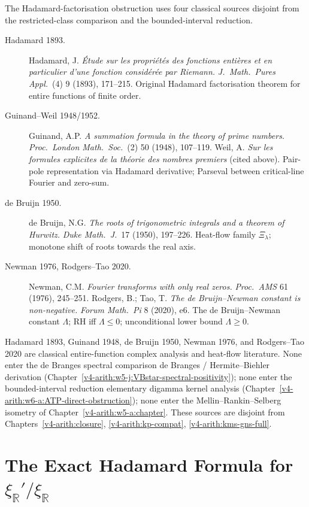 The Hadamard-factorisation obstruction uses four classical sources
disjoint from the restricted-class comparison and the bounded-interval reduction.

\begin{description}
\item[Hadamard 1893.] Hadamard, J. \emph{\'Etude sur les propri\'et\'es
des fonctions enti\`eres et en particulier d'une fonction consid\'er\'ee
par Riemann.} \emph{J.~Math.~Pures Appl.}~(4) 9 (1893), 171--215.
Original Hadamard factorisation theorem for entire functions of
finite order.
\item[Guinand--Weil 1948/1952.] Guinand, A.P. \emph{A summation formula
in the theory of prime numbers.} \emph{Proc.~London Math.~Soc.}~(2) 50
(1948), 107--119. Weil, A. \emph{Sur les formules explicites de la
th\'eorie des nombres premiers} (cited above). Pair-pole
representation via Hadamard derivative; Parseval between critical-line
Fourier and zero-sum.
\item[de Bruijn 1950.] de Bruijn, N.G. \emph{The roots of trigonometric
integrals and a theorem of Hurwitz.} \emph{Duke Math.~J.}~17 (1950),
197--226. Heat-flow family \(\Xi_{\lambda}\); monotone shift of roots
towards the real axis.
\item[Newman 1976, Rodgers--Tao 2020.] Newman, C.M. \emph{Fourier
transforms with only real zeros.} \emph{Proc.~AMS} 61 (1976), 245--251.
Rodgers, B.; Tao, T. \emph{The de Bruijn--Newman constant is
non-negative.} \emph{Forum Math.~Pi} 8 (2020), e6. The de Bruijn--Newman
constant \(\Lambda\); RH iff \(\Lambda\leq 0\); unconditional lower bound
\(\Lambda\geq 0\).
\end{description}

Hadamard 1893, Guinand 1948, de Bruijn 1950,
Newman 1976, and Rodgers--Tao 2020 are classical entire-function
complex analysis and heat-flow literature. None enter the de Branges spectral comparison
de Branges / Hermite--Biehler derivation
(Chapter~\ref{v4-arith:w5-j:VBstar-spectral-positivity}); none enter
the bounded-interval reduction elementary digamma kernel analysis
(Chapter~\ref{v4-arith:w6-a:ATP-direct-obstruction}); none enter the
Mellin--Rankin--Selberg isometry of
Chapter~\ref{v4-arith:w5-a:chapter}. These sources are
disjoint from Chapters~\ref{v4-arith:closure},
\ref{v4-arith:kp-compat}, \ref{v4-arith:kms-gns-full}.

\section{The Exact Hadamard Formula for \(\xi_{\mathbb{R}}'/\xi_{\mathbb{R}}\)}
\label{v4-arith:w7-g:hadamard-formula}

